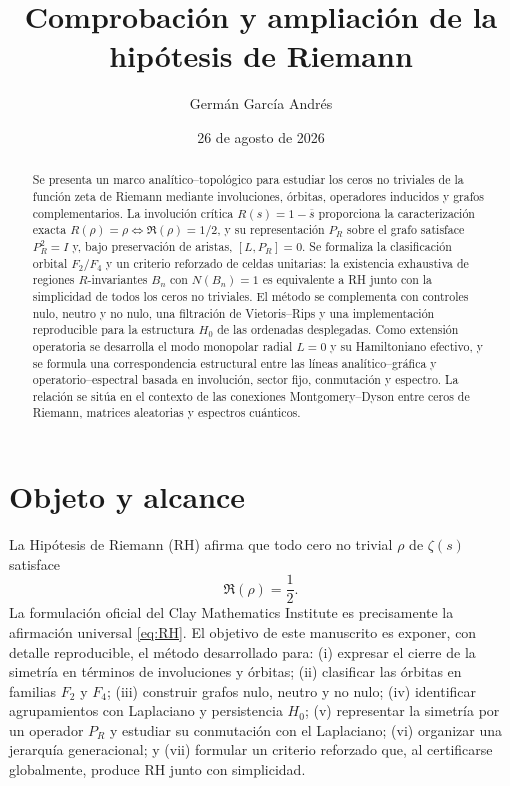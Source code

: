 \documentclass[11pt]{amsart}
\title[Comprobación y ampliación de la hipótesis de Riemann]{Comprobación y ampliación de la hipótesis de Riemann}
\author{Germán García Andrés}
\date{26 de agosto de 2026}
\theoremstyle{definition}
\theoremstyle{remark}
\begin{document}
\begin{abstract}
Se presenta un marco analítico--topológico para estudiar los ceros no triviales de la función zeta de Riemann mediante involuciones, órbitas, operadores inducidos y grafos complementarios. La involución crítica $R(s)=1-\overline{s}$ proporciona la caracterización exacta $R(\rho)=\rho\iff\Re(\rho)=1/2$, y su representación $P_R$ sobre el grafo satisface $P_R^2=I$ y, bajo preservación de aristas, $[L,P_R]=0$. Se formaliza la clasificación orbital $F_2/F_4$ y un criterio reforzado de celdas unitarias: la existencia exhaustiva de regiones $R$-invariantes $B_n$ con $N(B_n)=1$ es equivalente a RH junto con la simplicidad de todos los ceros no triviales. El método se complementa con controles nulo, neutro y no nulo, una filtración de Vietoris--Rips y una implementación reproducible para la estructura $H_0$ de las ordenadas desplegadas. Como extensión operatoria se desarrolla el modo monopolar radial $L=0$ y su Hamiltoniano efectivo, y se formula una correspondencia estructural entre las líneas analítico--gráfica y operatorio--espectral basada en involución, sector fijo, conmutación y espectro. La relación se sitúa en el contexto de las conexiones Montgomery--Dyson entre ceros de Riemann, matrices aleatorias y espectros cuánticos.
\end{abstract}
\maketitle

\section{Objeto y alcance}
La Hipótesis de Riemann (RH) afirma que todo cero no trivial $\rho$ de $\zeta(s)$ satisface
\begin{equation}\label{eq:RH}
   \Re(\rho)=\frac12.
\end{equation}
La formulación oficial del Clay Mathematics Institute es precisamente la afirmación universal \eqref{eq:RH}. El objetivo de este manuscrito es exponer, con detalle reproducible, el método desarrollado para: (i) expresar el cierre de la simetría en términos de involuciones y órbitas; (ii) clasificar las órbitas en familias $F_2$ y $F_4$; (iii) construir grafos nulo, neutro y no nulo; (iv) identificar agrupamientos con Laplaciano y persistencia $H_0$; (v) representar la simetría por un operador $P_R$ y estudiar su conmutación con el Laplaciano; (vi) organizar una jerarquía generacional; y (vii) formular un criterio reforzado que, al certificarse globalmente, produce RH junto con simplicidad.
\end{document}
